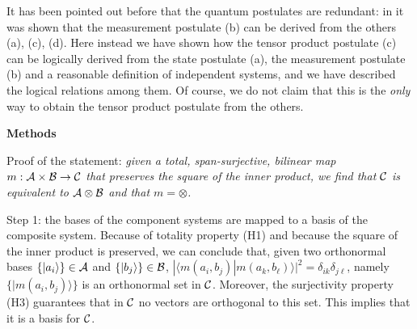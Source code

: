 \documentclass[aps,prl,amsmath,amssymb,twocolumn,nofootinbib]{revtex4}
\theoremstyle{plain}
\theoremstyle{definition}
\theoremstyle{remark}
\def\>{\rangle}
\def\<{\langle}
\begin{document}
	
	
	It has been pointed out before that the quantum postulates are
	redundant: in \cite{masanes,hartle} it was shown that the measurement
	postulate (b) can be derived from the others (a), (c), (d). Here
	instead we have shown how the tensor product postulate (c) can be
	logically derived from the state postulate (a), the measurement
	postulate (b) and a reasonable definition of independent systems, and
	we have described the logical relations among them.  Of course, we do
	not claim that this is the {\em only} way to obtain the tensor product
	postulate from the others.
	
	\baselineskip
	{\par\noindent\bf Methods}
	
	Proof of the statement: {\em given a total, span-surjective, bilinear
		map $m:{\cal A}\times{\cal B}\to{\cal C}$ that preserves the square
		of the inner product, we find that $\cal C $ is equivalent to $\cal
		A \otimes \cal B $ and that $m=\otimes$.}
	
	Step 1: the bases of the component systems are mapped to a basis of
	the composite system. Because of totality property (H1) and because
	the square of the inner product is preserved, we can conclude that,
	given two orthonormal bases $\{|a_i\>\}\in{\cal A}$ and
	$\{|b_j\>\}\in{\cal B}$,
	$|\<m(a_i,b_j)|m(a_k,b_\ell)\>|^2=\delta_{ik}\delta_{j\ell}$, namely
	$\{|m(a_i,b_j)\>\}$ is an orthonormal set in $\cal C$.  Moreover, the
	surjectivity property (H3) guarantees that in $\cal C$ no vectors are
	orthogonal to this set. This implies that it is a basis for $\cal C$.
	
\end{document}
